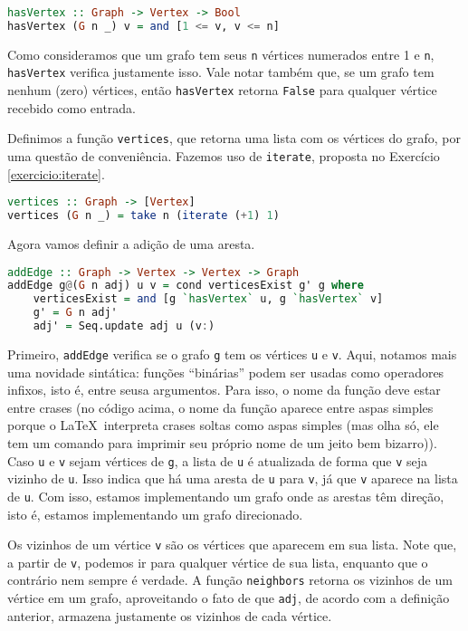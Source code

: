 \documentclass[a4paper]{article}
\begin{document}
\begin{lstlisting}[language=haskell, frame=single]
hasVertex :: Graph -> Vertex -> Bool
hasVertex (G n _) v = and [1 <= v, v <= n]
\end{lstlisting}

Como consideramos que um grafo tem seus \texttt{n} vértices numerados entre 1 e \texttt{n}, \texttt{hasVertex} verifica justamente isso.
Vale notar também que, se um grafo tem nenhum (zero) vértices, então \texttt{hasVertex} retorna \texttt{False} para qualquer vértice recebido como entrada.

Definimos a função \texttt{vertices}, que retorna uma lista com os vértices do grafo, por uma questão de conveniência.
Fazemos uso de \texttt{iterate}, proposta no Exercício \ref{exercicio:iterate}.

\begin{lstlisting}[language=haskell, frame=single]
vertices :: Graph -> [Vertex]
vertices (G n _) = take n (iterate (+1) 1)
\end{lstlisting}

Agora vamos definir a adição de uma aresta.

\begin{lstlisting}[language=haskell, frame=single]
addEdge :: Graph -> Vertex -> Vertex -> Graph
addEdge g@(G n adj) u v = cond verticesExist g' g where
	verticesExist = and [g `hasVertex` u, g `hasVertex` v]
	g' = G n adj'
	adj' = Seq.update adj u (v:)
\end{lstlisting}

Primeiro, \texttt{addEdge} verifica se o grafo \texttt{g} tem os vértices \texttt{u} e \texttt{v}.
Aqui, notamos mais uma novidade sintática: funções ``binárias'' podem ser usadas como operadores infixos, isto é, entre seusa argumentos.
Para isso, o nome da função deve estar entre crases (no código acima, o nome da função aparece entre aspas simples porque o \LaTeX\, interpreta crases soltas como aspas simples (mas olha só, ele tem um comando para imprimir seu próprio nome de um jeito bem bizarro)).
Caso \texttt{u} e \texttt{v} sejam vértices de \texttt{g}, a lista de \texttt{u} é atualizada de forma que \texttt{v} seja vizinho de \texttt{u}.
Isso indica que há uma aresta de \texttt{u} para \texttt{v}, já que \texttt{v} aparece na lista de \texttt{u}.
Com isso, estamos implementando um grafo onde as arestas têm direção, isto é, estamos implementando um grafo direcionado.

Os vizinhos de um vértice \texttt{v} são os vértices que aparecem em sua lista.
Note que, a partir de \texttt{v}, podemos ir para qualquer vértice de sua lista, enquanto que o contrário nem sempre é verdade.
A função \texttt{neighbors} retorna os vizinhos de um vértice em um grafo, aproveitando o fato de que \texttt{adj}, de acordo com a definição anterior, armazena justamente os vizinhos de cada vértice.
\end{document}
